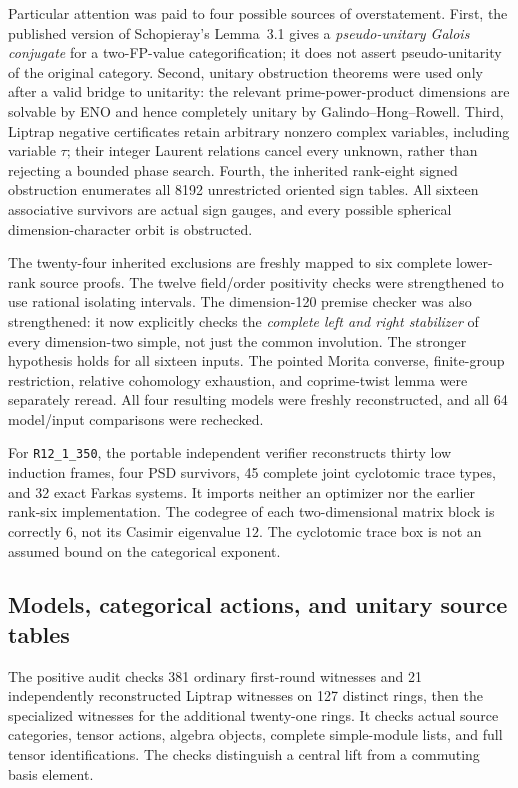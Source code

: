 \documentclass[11pt]{article}
\newcommand{\R}[1]{\texttt{R12\_1\_#1}}
\begin{document}
Particular attention was paid to four possible sources of overstatement.
First, the published version of Schopieray's Lemma~3.1 gives a
\emph{pseudo-unitary Galois conjugate} for a two-FP-value categorification;
it does not assert pseudo-unitarity of the original category. Second,
unitary obstruction theorems were used only after a valid bridge to
unitarity: the relevant prime-power-product dimensions are solvable by
ENO and hence completely unitary by Galindo--Hong--Rowell. Third,
Liptrap negative certificates retain arbitrary nonzero complex variables,
including variable $\tau$; their integer Laurent relations cancel every
unknown, rather than rejecting a bounded phase search. Fourth, the
inherited rank-eight signed obstruction enumerates all 8192 unrestricted
oriented sign tables. All sixteen associative survivors are actual sign
gauges, and every possible spherical dimension-character orbit is
obstructed.

The twenty-four inherited exclusions are freshly mapped to six complete
lower-rank source proofs. The twelve field/order positivity checks were
strengthened to use rational isolating intervals. The dimension-120
premise checker was also strengthened: it now explicitly checks the
\emph{complete left and right stabilizer} of every dimension-two simple,
not just the common involution. The stronger hypothesis holds for all
sixteen inputs. The pointed Morita converse, finite-group restriction,
relative cohomology exhaustion, and coprime-twist lemma were separately
reread. All four resulting models were freshly reconstructed, and all
64 model/input comparisons were rechecked.

For \R{350}, the portable independent verifier reconstructs thirty low
induction frames, four PSD survivors, 45 complete joint cyclotomic trace
types, and 32 exact Farkas systems. It imports neither an optimizer nor
the earlier rank-six implementation. The codegree of each two-dimensional
matrix block is correctly $6$, not its Casimir eigenvalue $12$. The
cyclotomic trace box is not an assumed bound on the categorical exponent.

\subsection{Models, categorical actions, and unitary source tables}
The positive audit checks 381 ordinary first-round witnesses and 21
independently reconstructed Liptrap witnesses on 127 distinct rings,
then the specialized witnesses for the additional twenty-one rings.
It checks actual source categories, tensor actions, algebra objects,
complete simple-module lists, and full tensor identifications.
The checks distinguish a central lift from a commuting basis element.
\end{document}

